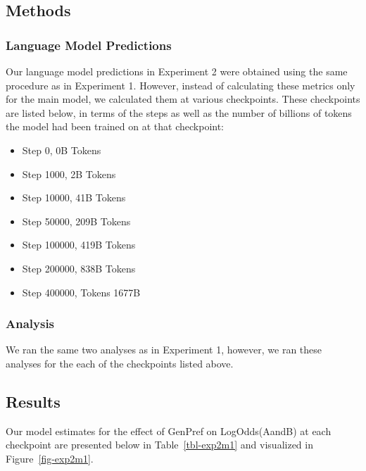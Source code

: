 \documentclass[
  nottoc]{article}
\begin{document}
\subsection{Methods}\label{methods-1}

\subsubsection{Language Model
Predictions}\label{language-model-predictions-1}

Our language model predictions in Experiment 2 were obtained using the
same procedure as in Experiment 1. However, instead of calculating these
metrics only for the main model, we calculated them at various
checkpoints. These checkpoints are listed below, in terms of the steps
as well as the number of billions of tokens the model had been trained
on at that checkpoint:

\begin{itemize}
\item
  Step 0, 0B Tokens
\item
  Step 1000, 2B Tokens
\item
  Step 10000, 41B Tokens
\item
  Step 50000, 209B Tokens
\item
  Step 100000, 419B Tokens
\item
  Step 200000, 838B Tokens
\item
  Step 400000, Tokens 1677B
\end{itemize}

\subsubsection{Analysis}\label{analysis}

We ran the same two analyses as in Experiment 1, however, we ran these
analyses for the each of the checkpoints listed above.

\subsection{Results}\label{results-1}

Our model estimates for the effect of GenPref on LogOdds(AandB) at each
checkpoint are presented below in Table~\ref{tbl-exp2m1} and visualized
in Figure~\ref{fig-exp2m1}.
\end{document}
